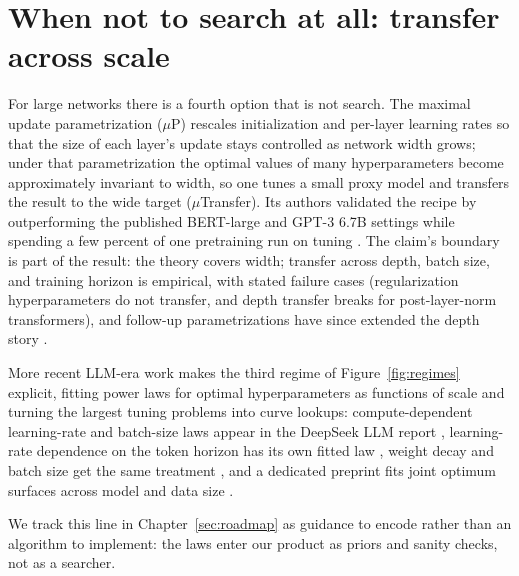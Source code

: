 \section{When not to search at all: transfer across scale}

For large networks there is a fourth option that is not search. The
maximal update parametrization ($\mu$P) rescales initialization and
per-layer learning rates so that the size of each layer's update stays
controlled as network width grows; under that parametrization the optimal
values of many hyperparameters become approximately invariant to width,
so one tunes a small proxy model and transfers the result to the wide
target ($\mu$Transfer). Its authors validated the recipe by
outperforming the published BERT-large and GPT-3 6.7B settings while
spending a few percent of one pretraining run on tuning
\citep{yang2022mutransfer}. The claim's boundary is part of the result:
the theory covers width; transfer across depth, batch size, and training
horizon is empirical, with stated failure cases (regularization
hyperparameters do not transfer, and depth transfer breaks for
post-layer-norm transformers), and follow-up parametrizations have since
extended the depth story \citep{dey2025completep}.

More recent LLM-era work makes the third regime of
Figure~\ref{fig:regimes} explicit, fitting power laws for optimal
hyperparameters as functions of scale and turning the largest tuning
problems into curve lookups: compute-dependent learning-rate and
batch-size laws appear in the DeepSeek LLM report \citep{deepseek2024llm},
learning-rate dependence on the token horizon has its own fitted law
\citep{bjorck2025tokenhorizon}, weight decay and batch size get the same
treatment \citep{bergsma2025powerlines}, and a dedicated preprint fits
joint optimum surfaces across model and data size \citep{li2025steplaw}.

We track this line in Chapter~\ref{sec:roadmap} as guidance to encode
rather than an algorithm to implement: the laws enter our product as
priors and sanity checks, not as a searcher.

